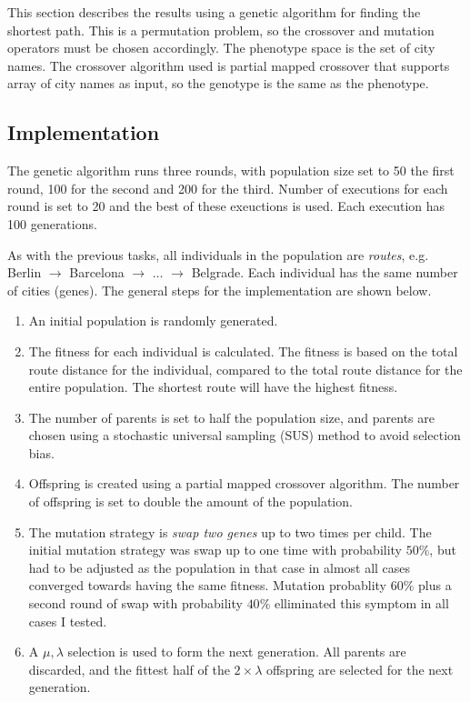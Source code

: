 \documentclass{article}
\begin{document}
This section describes the results using a genetic algorithm for finding the shortest path. This is a permutation problem, so the crossover and mutation operators must be chosen accordingly. The phenotype space is the set of city names. The crossover algorithm used is partial mapped crossover that supports array of city names as input, so the genotype is the same as the phenotype.

\subsection*{Implementation}

The genetic algorithm runs three rounds, with population size set to 50 the first round, 100 for the second and 200 for the third. Number of executions for each round is set to 20 and the best of these exeuctions is used. Each execution has 100 generations.

As with the previous tasks, all individuals in the population are \textit{routes}, e.g. Berlin $\rightarrow$ Barcelona $\rightarrow$ $\ldots$ $\rightarrow$ Belgrade. Each individual has the same number of cities (genes). The general steps for the implementation are shown below.

\begin{enumerate}
    \item An initial population is randomly generated.
    \item The fitness for each individual is calculated. The fitness is based on the total route distance for the individual, compared to the total route distance for the entire population. The shortest route will have the highest fitness.
    \item The number of parents is set to half the population size, and parents are chosen using a stochastic universal sampling (SUS) method to avoid selection bias.
    \item Offspring is created using a partial mapped crossover algorithm. The number of offspring is set to double the amount of the population.
    \item The mutation strategy is \textit{swap two genes} up to two times per child. The initial mutation strategy was swap up to one time with probability $50\%$, but had to be adjusted as the population in that case in almost all cases converged towards having the same fitness. Mutation probablity $60\%$ plus a second round of swap with probability $40\%$ elliminated this symptom in all cases I tested.
    \item A $\mu,\lambda$ selection is used to form the next generation. All parents are discarded, and the fittest half of the $2 \times \lambda$ offspring are selected for the next generation.
\end{enumerate}
\end{document}
